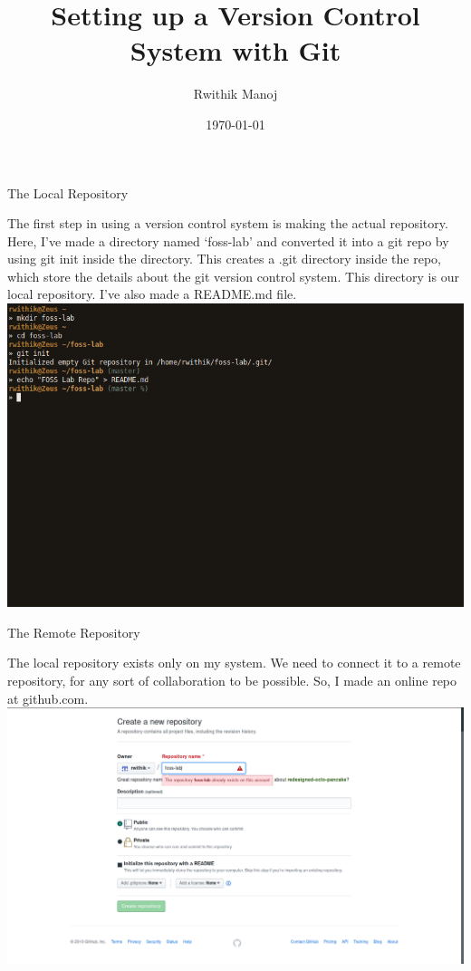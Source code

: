 \documentclass[10pt,a4paper,titlepage]{report}
\begin{document}
\begin{titlepage}
\author{Rwithik Manoj}
\title{Setting up a Version Control System with Git}
\date{\today}
\maketitle
\end{titlepage}
\begin{center}
\Large{The Local Repository}
\end{center}
\vspace{.5cm}
\par The first step in using a version control system is making the actual repository. Here, I've made a directory named `foss-lab' and converted it into a git repo by using {\color{red} git init} inside the directory. This creates a .git directory inside the repo, which store the details about the git version control system. This directory is our local repository. I've also made a README.md file. \newline
\newline
\includegraphics[scale=.45]{../Images/VCS/1.png}
\pagebreak
\begin{center}
\Large{The Remote Repository}
\end{center}
\vspace{.5cm}
\par The local repository exists only on my system. We need to connect it to a remote repository, for any sort of collaboration to be possible. So, I made an online repo at github.com. \newline\newline
\includegraphics[scale=.25]{../Images/VCS/github.png}\newline
\end{document}
